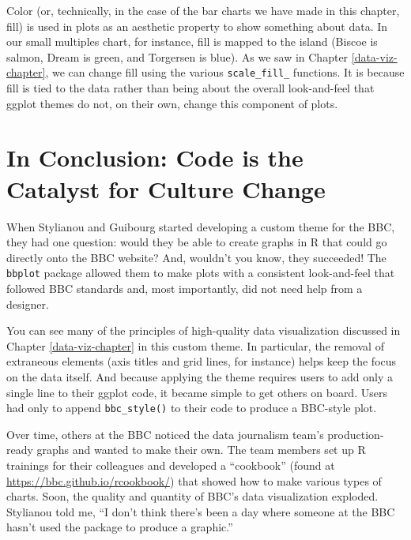 \documentclass[
]{book}
\begin{document}
Color (or, technically, in the case of the bar charts we have made in this chapter, fill) is used in plots as an aesthetic property to show something about data. In our small multiples chart, for instance, fill is mapped to the island (Biscoe is salmon, Dream is green, and Torgersen is blue). As we saw in Chapter \ref{data-viz-chapter}, we can change fill using the various \texttt{scale\_fill\_} functions. It is because fill is tied to the data rather than being about the overall look-and-feel that ggplot themes do not, on their own, change this component of plots.

\hypertarget{in-conclusion-code-is-the-catalyst-for-culture-change}{%
\section*{In Conclusion: Code is the Catalyst for Culture Change}\label{in-conclusion-code-is-the-catalyst-for-culture-change}}

When Stylianou and Guibourg started developing a custom theme for the BBC, they had one question: would they be able to create graphs in R that could go directly onto the BBC website? And, wouldn't you know, they succeeded! The \texttt{bbplot} package allowed them to make plots with a consistent look-and-feel that followed BBC standards and, most importantly, did not need help from a designer.

You can see many of the principles of high-quality data visualization discussed in Chapter \ref{data-viz-chapter} in this custom theme. In particular, the removal of extraneous elements (axis titles and grid lines, for instance) helps keep the focus on the data itself. And because applying the theme requires users to add only a single line to their ggplot code, it became simple to get others on board. Users had only to append \texttt{bbc\_style()} to their code to produce a BBC-style plot.

Over time, others at the BBC noticed the data journalism team's production-ready graphs and wanted to make their own. The team members set up R trainings for their colleagues and developed a ``cookbook'' (found at \url{https://bbc.github.io/rcookbook/}) that showed how to make various types of charts. Soon, the quality and quantity of BBC's data visualization exploded. Stylianou told me, ``I don't think there's been a day where someone at the BBC hasn't used the package to produce a graphic.''
\end{document}
